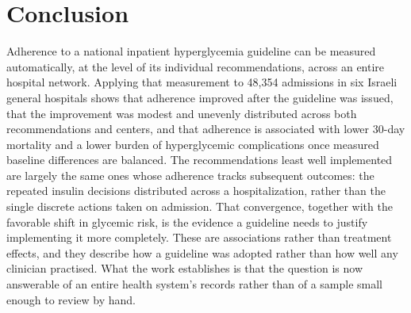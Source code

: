 \section{Conclusion}
\label{sec:conclusion}

Adherence to a national inpatient hyperglycemia guideline can be measured
automatically, at the level of its individual recommendations, across an entire
hospital network. Applying that measurement to 48,354 admissions in six Israeli
general hospitals shows that adherence improved after the guideline was issued,
that the improvement was modest and unevenly distributed across both
recommendations and centers, and that adherence is associated with lower 30-day
mortality and a lower burden of hyperglycemic complications once measured
baseline differences are balanced. The recommendations least well implemented
are largely the same ones whose adherence tracks subsequent outcomes: the
repeated insulin decisions distributed across a hospitalization,
rather than the single discrete actions taken on admission. That convergence,
together with the favorable shift in glycemic risk, is the evidence a guideline
needs to justify implementing it more completely. These are associations rather
than treatment effects, and they describe how a guideline was adopted rather
than how well any clinician practised. What the work establishes is that the
question is now answerable of an entire health system's records rather than of
a sample small enough to review by hand.
